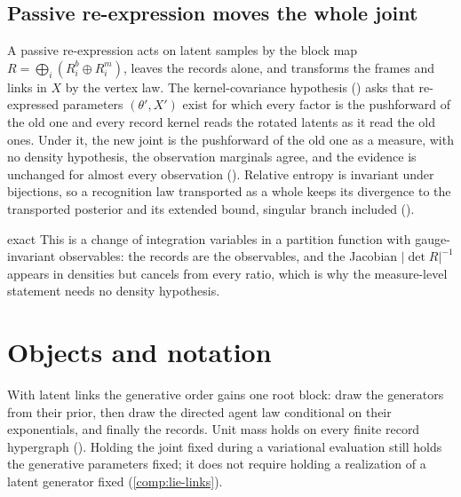 \subsection{Passive re-expression moves the whole joint}

A passive re-expression acts on latent samples by the block map $R=\bigoplus_i(R_i^b\oplus R_i^m)$, leaves the
records alone, and transforms the frames and links in $X$ by the vertex law. The kernel-covariance hypothesis
() asks that re-expressed parameters $(\theta',X')$ exist for which every factor is
the pushforward of the old one and every record kernel reads the rotated latents as it read the old ones. Under
it, the new joint is the pushforward of the old one as a measure, with no density hypothesis, the observation
marginals agree, and the evidence is unchanged for almost every observation
(). Relative entropy is invariant under bijections, so a recognition law
transported as a whole keeps its divergence to the transported posterior and its extended bound, singular branch
included ().

\begin{analogy}{exact}
This is a change of integration variables in a partition function with gauge-invariant observables: the records
are the observables, and the Jacobian $\lvert\det R\rvert^{-1}$ appears in densities but cancels from every ratio,
which is why the measure-level statement needs no density hypothesis.
\end{analogy}

\section{Objects and notation}
\label{comp:ch04-objects}

With latent links the generative order gains one root block: draw the generators from their prior,
then draw the directed agent law conditional on their exponentials, and finally the records.
Unit mass holds on every finite record hypergraph (). Holding
the joint fixed during a variational evaluation still holds the generative parameters fixed;
it does not require holding a realization of a latent generator fixed (\cref{comp:lie-links}).

